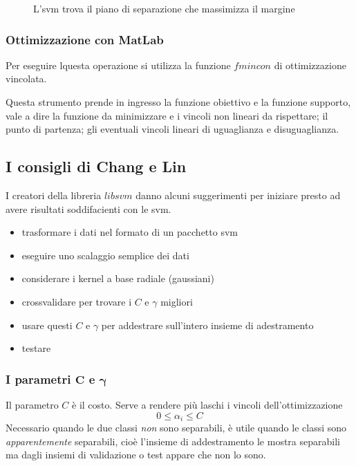 \begin{figure}
\centering

\caption{L'\acs{svm} trova il piano di separazione che massimizza il margine}
\label{fig:clus_svm}
\end{figure}

\subsubsection{Ottimizzazione con MatLab}
Per eseguire lquesta operazione si utilizza la funzione
\(fmincon\) di ottimizzazione vincolata.

\par
Questa strumento prende in ingresso
la funzione obiettivo e la funzione supporto,
vale a dire la funzione da minimizzare e i vincoli non lineari da rispettare;
il punto di partenza;
gli eventuali vincoli lineari di uguaglianza e disuguaglianza.


\subsection {I consigli di Chang e Lin}
I creatori della libreria $libsvm$ danno alcuni suggerimenti
per iniziare presto ad avere risultati soddifacienti con le \ac{svm}.
\begin{itemize}
  \item {trasformare i dati nel formato di un pacchetto svm}
  \item {eseguire uno scalaggio semplice dei dati}
  \item {considerare i kernel a base radiale (gaussiani)}
  \item {crossvalidare per trovare i $C$ e $\gamma$ migliori}
  \item {usare questi $C$ e $\gamma$ per addestrare sull'intero insieme di adestramento}
  \item {testare}
\end{itemize}

\subsubsection {I parametri $\mathbf{C}$ e $\mathbf{\gamma}$}
Il parametro $C$ \`e il costo.
Serve a rendere pi\`u laschi i vincoli dell'ottimizzazione
\begin{equation}
  \label{eq:vincoliC}
  0 \leq \alpha_i \leq C
\end{equation}
Necessario quando le due classi \emph{non} sono separabili,
\`e utile quando le classi sono \textit{apparentemente} separabili,
cio\`e l'insieme di addestramento le mostra separabili
ma dagli insiemi di validazione o test appare che non lo sono.

